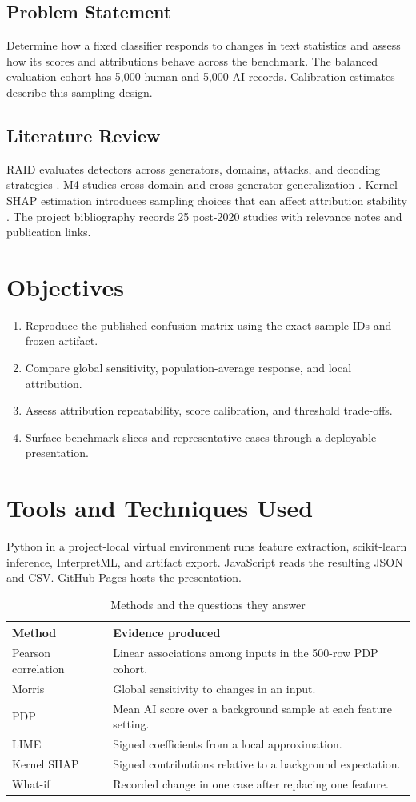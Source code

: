 \documentclass[12pt,oneside]{report}
\begin{document}
\section{Problem Statement}
Determine how a fixed classifier responds to changes in text statistics and assess how its scores and attributions behave across the benchmark. The balanced evaluation cohort has 5,000 human and 5,000 AI records. Calibration estimates describe this sampling design.
\section{Literature Review}
RAID evaluates detectors across generators, domains, attacks, and decoding strategies \cite{raid}. M4 studies cross-domain and cross-generator generalization \cite{m4}. Kernel SHAP estimation introduces sampling choices that can affect attribution stability \cite{kernel}. The project bibliography records 25 post-2020 studies with relevance notes and publication links.
\chapter{Objectives}
\begin{enumerate}
\item Reproduce the published confusion matrix using the exact sample IDs and frozen artifact.
\item Compare global sensitivity, population-average response, and local attribution.
\item Assess attribution repeatability, score calibration, and threshold trade-offs.
\item Surface benchmark slices and representative cases through a deployable presentation.
\end{enumerate}
\chapter{Tools and Techniques Used}
Python in a project-local virtual environment runs feature extraction, scikit-learn inference, InterpretML, and artifact export. JavaScript reads the resulting JSON and CSV. GitHub Pages hosts the presentation.
\begin{table}[htbp]\centering
\caption{Methods and the questions they answer}
\begin{tabularx}{\linewidth}{lX}
\toprule Method & Evidence produced \\ \midrule
Pearson correlation & Linear associations among inputs in the 500-row PDP cohort. \\
Morris & Global sensitivity to changes in an input. \\
PDP & Mean AI score over a background sample at each feature setting. \\
LIME & Signed coefficients from a local approximation. \\
Kernel SHAP & Signed contributions relative to a background expectation. \\
What-if & Recorded change in one case after replacing one feature. \\
\bottomrule
\end{tabularx}
\end{table}
\end{document}
